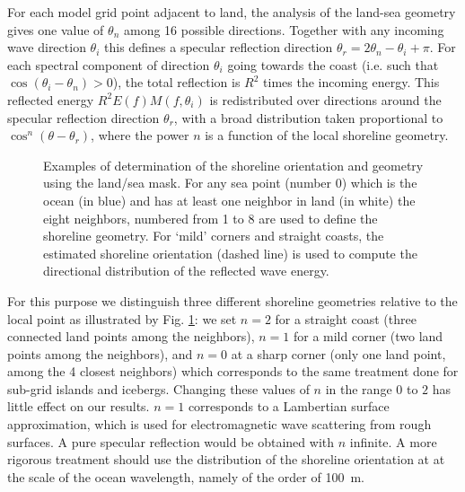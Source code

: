 For each model grid point adjacent to land, the analysis of the land-sea
geometry gives one value of $\theta_n$ among 16 possible directions. Together
with any incoming wave direction $\theta_i$ this defines a specular reflection
direction $\theta_r=2 \theta_n - \theta_i + \pi$.  For each spectral component
of direction $\theta_i$ going towards the coast (i.e. such that
$\cos(\theta_i-\theta_n) >0$), the total reflection is $R^2$ times the
incoming energy. This reflected energy $R^2 E(f) M(f,\theta_i)$ is
redistributed over directions around the specular reflection direction
$\theta_r$, with a broad distribution taken proportional to
$\cos^n(\theta-\theta_r)$, where the power $n$ is a function of the local
shoreline geometry.

\begin{figure} \begin{center}
\caption{Examples of determination of the shoreline orientation and geometry
  using the land/sea mask. For any sea point (number 0) which is the ocean
  (in blue) and has at least one neighbor in land (in white) the eight
  neighbors, numbered from 1 to 8 are used to define the shoreline geometry.
  For `mild' corners and straight coasts, the estimated shoreline orientation
  (dashed line) is used to compute the directional distribution of the
  reflected wave energy.  }
\label{fig:refl} \botline
\end{center}
\end{figure}

For this purpose we distinguish three different shoreline geometries relative
to the local point as illustrated by Fig. \ref{fig:refl}: we set $n=2$ for a
straight coast (three connected land points among the neighbors), $n=1$ for a
mild corner (two land points among the neighbors), and $n=0$ at a sharp corner
(only one land point, among the 4 closest neighbors) which corresponds to the
same treatment done for sub-grid islands and icebergs. Changing these values
of $n$ in the range $0$ to $2$ has little effect on our results.  $n=1$
corresponds to a Lambertian surface approximation, which is used for
electromagnetic wave scattering from rough surfaces. A pure specular
reflection would be obtained with $n$ infinite.  A more rigorous treatment
should use the distribution of the shoreline orientation at at the scale of
the ocean wavelength, namely of the order of 100~m.
